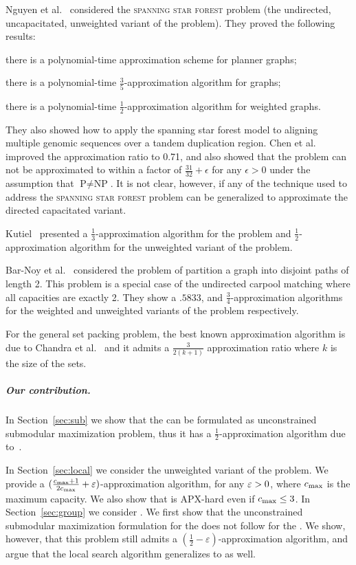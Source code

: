 Nguyen et al.~\cite{nguyen2008approximating} considered
the \textsc{spanning star forest} problem (the undirected,
uncapacitated, unweighted variant of the problem).  They proved the
following results:
\begin{inparaenum}[(i)]
\item there is a polynomial-time approximation scheme for planner graphs;
\item there is a polynomial-time $\frac{3}{5}$-approximation algorithm for graphs;
\item there is a polynomial-time $\frac{1}{2}$-approximation algorithm for weighted graphs.
\end{inparaenum}
They also showed how to apply the spanning star forest model to
aligning multiple genomic sequences over a tandem duplication region.
Chen et al.~\cite{chen2007improved} improved the approximation ratio
to 0.71, and also showed that the problem can not be approximated to
within a factor of $\frac{31}{32} + \epsilon$ for any $\epsilon > 0$
under the assumption that $\text{P} \neq \text{NP}$.  It is not clear,
however, if any of the technique used to address the
\textsc{spanning star forest} problem can be generalized to approximate the
directed capacitated variant.

Kutiel~\cite{kutiel2016} presented a $\frac{1}{3}$-approximation
algorithm for the problem and $\frac{1}{2}$-approximation algorithm for the
unweighted variant of the problem.

Bar-Noy et al.~\cite{bar2015improved} considered the problem of partition a
graph into disjoint paths of length 2.
This problem is a special case of the undirected carpool matching
where all capacities are exactly 2.
They show a $.5833$, and $\frac{3}{4}$-approximation algorithms for the weighted
and unweighted variants of the problem respectively.

For the general set packing problem, the best known approximation algorithm is
due to Chandra et al.~\cite{chandra2001greedy} and it admits a 
$\frac{3}{2(k +1)}$ approximation ratio where $k$ is the size of the sets.


\subparagraph{Our contribution.}
%
In Section~\ref{sec:sub} we show that the \carpool can be formulated as
unconstrained submodular maximization problem, thus it has a
$\frac{1}{2}$-approximation algorithm due to~\cite{BFNS15}.  

In Section~\ref{sec:local} we consider the unweighted variant of the
problem.  We provide a $(\frac{c_{\max}+1}{2c_{\max}} + \varepsilon)$-approximation
algorithm, for any $\varepsilon>0$, where $c_{\max}$ is the maximum capacity.
We also show that \carpool is APX-hard even if $c_{\max} \leq 3$.
%
In Section~\ref{sec:group} we consider \gcp.  
We first show that the unconstrained submodular maximization formulation for
the \carpool does not follow for the \gcp.
We show, however, that this problem still admits
a $(\frac{1}{2} -\varepsilon)$-approximation algorithm, and argue that the local
search algorithm generalizes to \gcp as well.
